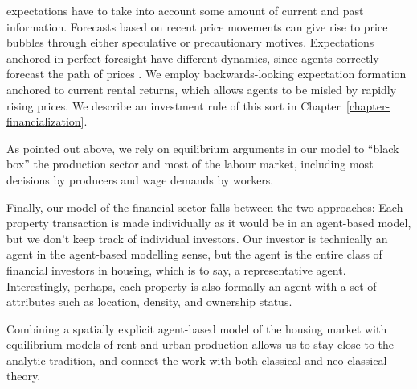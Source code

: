 \Glspl{expectation} have to take into account some amount of current and past information. Forecasts based on recent price movements can give rise to \glspl{price bubble} through either speculative or precautionary motives. Expectations anchored in \gls{perfect foresight} have different dynamics, since agents correctly forecast the path of prices \cite{muthRationalExpectationsTheory1961}. We employ backwards-looking expectation formation anchored 
to current rental returns, which allows agents to be misled by rapidly rising prices. We describe an investment rule of this sort in Chapter~\ref{chapter-financialization}. 


As pointed out above, we rely on equilibrium arguments in our model to ``black box'' the production sector and most of the labour market, including most decisions by producers and wage demands by workers.  




Finally, our model of the financial sector falls between the two approaches: Each property transaction is made individually as it would be in an agent-based model, but we don't keep track of individual investors. Our investor is technically an agent in the agent-based modelling sense, but the agent is the entire class of financial investors in housing, which is to say, a representative agent. Interestingly, perhaps, each property is also formally an agent with a set of attributes such as location, density, and ownership status. 


Combining a spatially explicit agent-based model of the housing market with equilibrium  models of rent and urban production allows us to stay close to the analytic tradition, and connect the work with both classical and neo-classical theory. %



